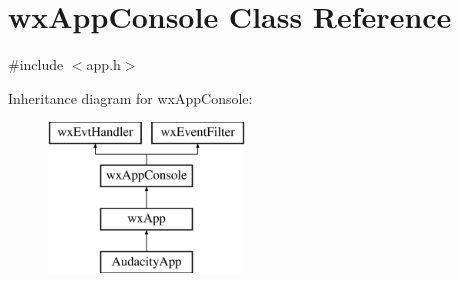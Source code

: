 \hypertarget{classwx_app_console}{}\section{wx\+App\+Console Class Reference}
\label{classwx_app_console}


{\ttfamily \#include $<$app.\+h$>$}

Inheritance diagram for wx\+App\+Console\+:\begin{figure}[H]
\begin{center}
\leavevmode
\includegraphics[height=4.000000cm]{classwx_app_console}
\end{center}
\end{figure}
